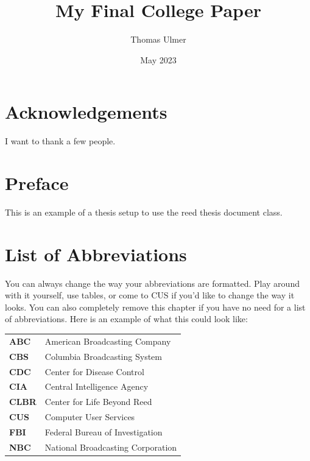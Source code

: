 \documentclass[12pt,twoside]{reedthesis}
\title{My Final College Paper}
\author{Thomas Ulmer}
\date{May 2023}
\begin{document}
  \maketitle
  \frontmatter %
  \pagestyle{empty} %

    \chapter*{Acknowledgements}
        I want to thank a few people.

    \chapter*{Preface}
        This is an example of a thesis setup to use the reed thesis document class.



    \chapter*{List of Abbreviations}
                You can always change the way your abbreviations are formatted. Play around with it yourself, use tables, or come to CUS if you'd like to change the way it looks. You can also completely remove this chapter if you have no need for a list of abbreviations. Here is an example of what this could look like:

        \begin{table}[h]
        \centering %
        \begin{tabular}{ll}
                \textbf{ABC}    &  American Broadcasting Company \\
                \textbf{CBS}    &  Columbia Broadcasting System\\
                \textbf{CDC}    &  Center for Disease Control \\
                \textbf{CIA}    &  Central Intelligence Agency\\
                \textbf{CLBR}   &  Center for Life Beyond Reed\\
                \textbf{CUS}    &  Computer User Services\\
                \textbf{FBI}    &  Federal Bureau of Investigation\\
                \textbf{NBC}    &  National Broadcasting Corporation\\
        \end{tabular}
        \end{table}
\end{document}
